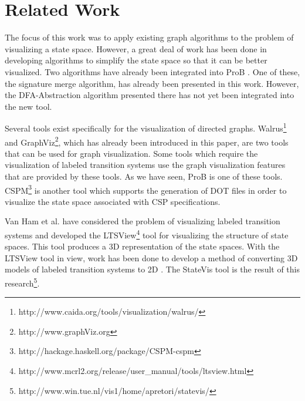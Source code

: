 \section{Related Work}

The focus of this work was to apply existing graph algorithms to the problem of visualizing a state space. However, a great deal of work has been done in developing algorithms to simplify the state space so that it can be better visualized. Two algorithms have already been integrated into ProB \cite{LeTu05_8}. One of these, the signature merge algorithm, has already been presented in this work. However, the DFA-Abstraction algorithm presented there has not yet been integrated into the new tool.

Several tools exist specifically for the visualization of directed graphs. Walrus\footnote{http://www.caida.org/tools/visualization/walrus/} and GraphViz\footnote{http://www.graphViz.org}, which has already been introduced in this paper, are two tools that can be used for graph visualization. Some tools which require the visualization of labeled transition systems use the graph visualization features that are provided by these tools. As we have seen, ProB is one of these tools. CSPM\footnote{http://hackage.haskell.org/package/CSPM-cspm} is another tool which supports the generation of DOT files in order to visualize the state space associated with CSP specifications.

Van Ham et al. \cite{Ham02} have considered the problem of visualizing labeled transition systems and developed the LTSView\footnote{http://www.mcrl2.org/release/user\_manual/tools/ltsview.html} tool for visualizing the structure of state spaces. This tool produces a 3D representation of the state spaces. With the LTSView tool in view, work has been done to develop a method of converting 3D models of labeled transition systems to 2D \cite{Pretorius2005}. The StateVis tool is the result of this research\footnote{http://www.win.tue.nl/vis1/home/apretori/statevis/}.
